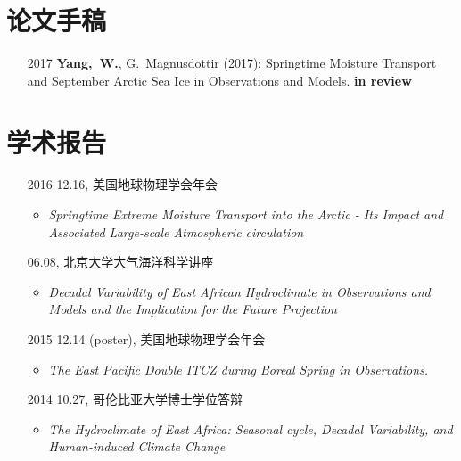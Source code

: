 \documentclass[11pt]{article}
\newcommand{\meetingName}[1]{#1}
\newcommand{\ptitle}[1]{\textit{#1}}
\begin{document}
\begin{CJK*}{UTF8}{gkai}
\begin{itemize}[leftmargin=10ex,label={}, itemsep=1ex]
\end{itemize}


\section{论文手稿}
\begin{itemize}[itemsep=0.3em,parsep=0pt, leftmargin=10ex]
	\item[2017] \textbf{Yang,~W.}, G.~Magnusdottir (2017): Springtime Moisture Transport and September Arctic Sea Ice in Observations and Models. \textbf{in review}
	
\end{itemize}



\section{学术报告}
\begin{itemize}[leftmargin=10ex,label={},noitemsep,nolistsep]
    \item[2016] 12.16, \meetingName{美国地球物理学会年会}
    \begin{itemize}[leftmargin=4ex,label={},noitemsep,nolistsep]
		\item \ptitle{Springtime Extreme Moisture Transport into the Arctic - Its Impact and Associated Large-scale Atmospheric circulation}
		\end{itemize}

	\item[\phantom{2016}] 06.08, \meetingName{北京大学大气海洋科学讲座}
	\begin{itemize}[leftmargin=4ex,label={},noitemsep,nolistsep]
		\item \ptitle{Decadal Variability of East African Hydroclimate in Observations and Models and the Implication for the Future Projection}
		\end{itemize}
	
	\item[2015]12.14 (poster),  \meetingName{美国地球物理学会年会}
	\begin{itemize}[leftmargin=4ex,label={},noitemsep,nolistsep]
		\item \ptitle{The East Pacific Double ITCZ during Boreal Spring in Observations.}
		\end{itemize}
	
	\item [2014] 10.27,  \meetingName{哥伦比亚大学博士学位答辩}
	\begin{itemize}[leftmargin=4ex,label={},noitemsep,nolistsep]
		\item \ptitle{The Hydroclimate of East Africa: Seasonal cycle, Decadal Variability, and Human-induced Climate Change}
		\end{itemize}
	

\end{itemize}
\end{CJK*}
\end{document}
